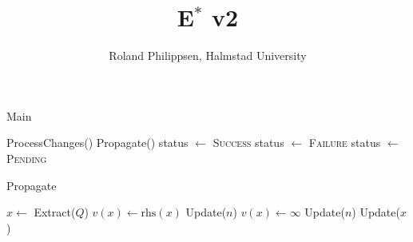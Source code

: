 \documentclass[twocolumn]{article}
\newcommand{\rhs}{\text{rhs}}
\begin{document}
\title{E$^\ast$ v2}
\author{Roland Philippsen, Halmstad University}
\maketitle

\begin{algorithm}
  \caption{Main}\label{algo:main}
  \begin{algorithmic}
    \LOOP
      \STATE ProcessChanges()
      \STATE Propagate()
        \STATE status $\leftarrow$ \textsc{Success}
        \STATE status $\leftarrow$ \textsc{Failure}
      \ELSE
        \STATE status $\leftarrow$ \textsc{Pending}
      \ENDIF
    \ENDLOOP
  \end{algorithmic}
\end{algorithm}

\begin{algorithm}
  \caption{Propagate}\label{algo:propagate}
  \begin{algorithmic}
      \STATE $x \leftarrow$ Extract($Q$)
      \IF { $v(x) > \rhs(x)$ }
        \STATE $v(x) \leftarrow \rhs(x)$
          \STATE Update($n$)
        \ENDFOR
      \ELSE
        \STATE $v(x) \leftarrow \infty$
          \STATE Update($n$)
        \ENDFOR
        \STATE Update($x$)
      \ENDIF
    \ENDIF
  \end{algorithmic}
\end{algorithm}
\end{document}
